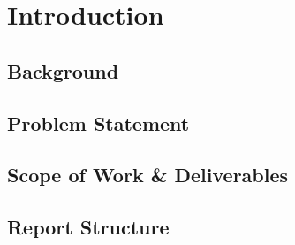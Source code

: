 \section{Introduction}

\subsection{Background}

\subsection{Problem Statement}

\subsection{Scope of Work \& Deliverables}

\subsection{Report Structure}
